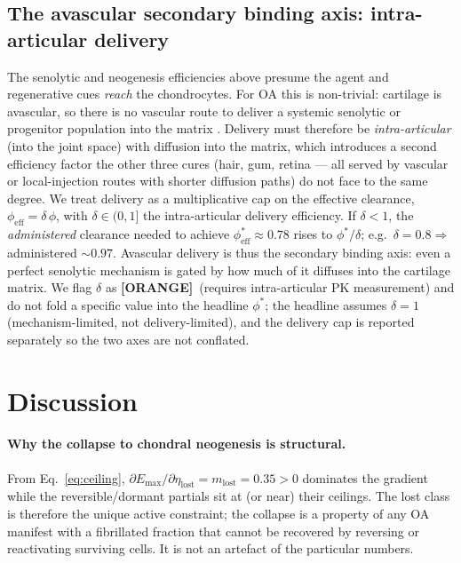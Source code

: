 \documentclass[11pt,a4paper]{article}
\newcommand{\tierbadge}[2]{\textcolor{#1}{\textbf{[#2]}}}
\providecommand{\tierOrange}{\tierbadge{orange!80!black}{ORANGE}}
\begin{document}
\subsection{The avascular secondary binding axis: intra-articular delivery}
\label{sec:avascular}
The senolytic and neogenesis efficiencies above presume the agent and regenerative cues
\emph{reach} the chondrocytes. For OA this is non-trivial: cartilage is avascular, so
there is no vascular route to deliver a systemic senolytic or progenitor population into
the matrix \citep{sophia2009}. Delivery must therefore be \emph{intra-articular} (into the
joint space) with diffusion into the matrix, which introduces a second efficiency factor
the other three cures (hair, gum, retina --- all served by vascular or local-injection
routes with shorter diffusion paths) do not face to the same degree. We treat delivery as
a multiplicative cap on the effective clearance, $\phi_{\text{eff}}=\delta\,\phi$, with
$\delta\in(0,1]$ the intra-articular delivery efficiency. If $\delta<1$, the
\emph{administered} clearance needed to achieve $\phi^\ast_{\text{eff}}\approx0.78$ rises
to $\phi^\ast/\delta$; e.g.\ $\delta=0.8 \Rightarrow$ administered ${\sim}0.97$. Avascular
delivery is thus the secondary binding axis: even a perfect senolytic mechanism is gated
by how much of it diffuses into the cartilage matrix. We flag $\delta$ as \tierOrange\
(requires intra-articular PK measurement) and do not fold a specific value into the
headline $\phi^\ast$; the headline assumes $\delta=1$ (mechanism-limited, not
delivery-limited), and the delivery cap is reported separately so the two axes are not
conflated.

\section{Discussion}
\label{sec:discussion}
\paragraph{Why the collapse to chondral neogenesis is structural.} From
Eq.~\eqref{eq:ceiling}, $\partial E_{\max}/\partial\eta_{\text{lost}}=m_{\text{lost}}=0.35>0$
dominates the gradient while the reversible/dormant partials sit at (or near) their
ceilings. The lost class is therefore the unique active constraint; the collapse is a
property of any OA manifest with a fibrillated fraction that cannot be recovered by
reversing or reactivating surviving cells. It is not an artefact of the particular
numbers.
\end{document}
